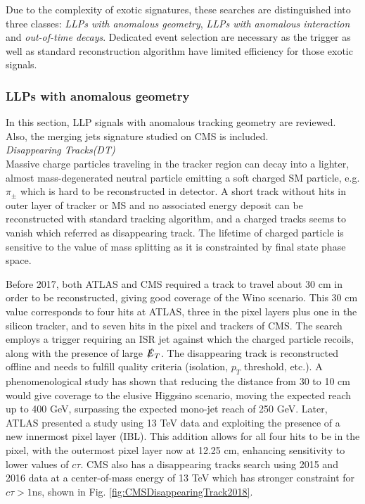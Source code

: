 Due to the complexity of exotic signatures, these searches are distinguished into three classes: \textit{LLPs with anomalous geometry}, \textit{LLPs with anomalous interaction} and  \textit{out-of-time decays}. Dedicated event selection are necessary as the trigger as well as  standard reconstruction algorithm have limited efficiency for those exotic signals. 

\subsubsection{LLPs with anomalous geometry}
In this section, LLP signals with anomalous tracking geometry are reviewed. Also, the merging jets signature studied on CMS is included. \\

\textit{Disappearing Tracks(DT)}\\

Massive charge particles traveling in the tracker region can decay into a lighter, almost mass-degenerated neutral particle emitting a soft charged SM particle, e.g. $\pi_{\pm}$ which is hard to be reconstructed in detector. A short track without hits in outer layer of tracker or MS and no associated energy deposit can be reconstructed with standard tracking algorithm, and a charged tracks seems to vanish which referred as disappearing track. The lifetime of charged particle is sensitive to the value of mass splitting as it is constrainted by final state phase space.

Before 2017, both ATLAS and CMS  required a track to travel about 30 cm in order to be reconstructed, giving good coverage of the Wino scenario. This 30 cm value corresponds to four hits at ATLAS, three in the pixel layers plus one in the silicon tracker, and to seven hits in the pixel and trackers of CMS. The search employs a trigger requiring an ISR jet against which the charged particle recoils, along with the presence of large $\slashed{E}_T$. The disappearing track is reconstructed offline and needs to fulfill quality criteria (isolation, $p_T$ threshold, etc.). A phenomenological study has shown that reducing the distance from 30 to 10 cm would give coverage to the elusive Higgsino scenario, moving the expected reach up to 400 GeV, surpassing the expected mono-jet reach of 250 GeV. Later, ATLAS presented a study using 13 TeV data and exploiting the presence of a new innermost pixel layer (IBL). This addition allows for all four hits to be in the pixel, with the outermost pixel layer now at 12.25 cm, enhancing sensitivity to lower values of $c\tau$. CMS also has a disappearing tracks search using 2015 and 2016 data at a center-of-mass energy of 13 TeV which has stronger constraint for $c\tau > 1$ns, shown in Fig. \ref{fig:CMSDisappearingTrack2018}.

